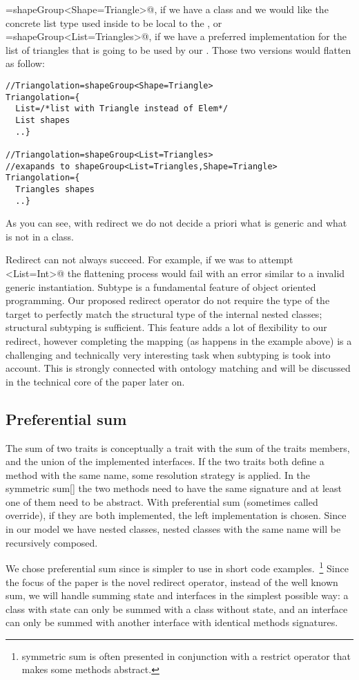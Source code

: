 \Q@Triangolation=shapeGroup<Shape=Triangle>@,
if we have a \Q@Triangle@ class and we would like the concrete list type
used inside to be local to the \Q@Triangolation@,
or 
\Q@Triangolation=shapeGroup<List=Triangles>@,
if we have a preferred implementation for the list of triangles that is going to be used by our
\Q@Triangolation@.
Those two versions would flatten as follow:
\begin{lstlisting}
//Triangolation=shapeGroup<Shape=Triangle>
Triangolation={
  List=/*list with Triangle instead of Elem*/
  List shapes
  ..}

//Triangolation=shapeGroup<List=Triangles>
//exapands to shapeGroup<List=Triangles,Shape=Triangle>
Triangolation={
  Triangles shapes
  ..}
\end{lstlisting}
As you can see, with redirect we do not decide a priori what is generic and what is not in a class.

Redirect can not always succeed. For example, if we was to attempt
\Q@shapeGroup<List=Int>@ the flattening process would fail with an error similar to a 
invalid generic instantiation.
Subtype is a fundamental feature of object oriented programming. Our proposed redirect operator
do not require the type of the target to perfectly match the structural type of the internal nested classes;
structural subtyping is sufficient.
This feature adds a lot of flexibility to our redirect,
however completing the mapping
(as happens in the example above) is a challenging and technically very interesting
task when subtyping is took into account. This is strongly connected with ontology matching and
will be discussed in the technical core of the paper later on.

\subsection{Preferential sum}
The sum of two traits is conceptually a trait with the sum of the traits members, and the union of the implemented interfaces.
If the two traits both define a method with the same name, some resolution strategy is applied.
In the symmetric sum[] the two methods need to have the same signature and at least one of them need to be abstract.
With preferential sum (sometimes called override), if they are both implemented, the left implementation is chosen.
Since in our model we have nested classes, nested classes with the same name will be recursively composed.

We chose preferential sum since is simpler to use in short code examples.~\footnote{symmetric sum is often presented in conjunction with a restrict operator that makes some methods abstract.}
Since the focus of the paper is the novel redirect operator, instead of the well known sum, we will handle summing state and interfaces in the simplest possible way:
a class with state can only be summed with a class without state, and an interface can only be summed with another interface with identical methods signatures.

